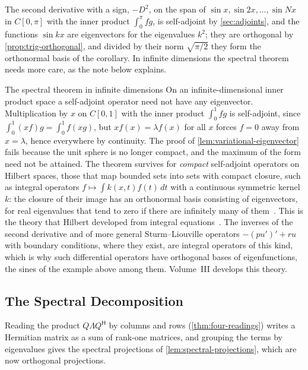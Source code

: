 The second derivative with a sign, $-D^2$, on the span of $\sin x,\sin2x,\ldots,\sin Nx$ in $C[0,\pi]$ with the inner product $\int_0^\pi fg$, is self-adjoint by \cref{sec:adjoints}, and the functions $\sin kx$ are eigenvectors for the eigenvalues $k^2$; they are orthogonal by \cref{prop:trig-orthogonal}, and divided by their norm $\sqrt{\pi/2}$ they form the orthonormal basis of the corollary. In infinite dimensions the spectral theorem needs more care, as the note below explains.

\begin{note}{The spectral theorem in infinite dimensions}
On an infinite-dimensional inner product space a self-adjoint operator need not have any eigenvector. Multiplication by $x$ on $C[0,1]$ with the inner product $\int_0^1fg$ is self-adjoint, since $\int_0^1(xf)g=\int_0^1f(xg)$, but $xf(x)=\lambda f(x)$ for all $x$ forces $f=0$ away from $x=\lambda$, hence everywhere by continuity. The proof of \cref{lem:variational-eigenvector} fails because the unit sphere is no longer compact, and the maximum of the form need not be attained. The theorem survives for \emph{compact} self-adjoint operators on Hilbert spaces, those that map bounded sets into sets with compact closure, such as integral operators $f\mapsto\int k(x,t)f(t)\,dt$ with a continuous symmetric kernel $k$: the closure of their image has an orthonormal basis consisting of eigenvectors, for real eigenvalues that tend to zero if there are infinitely many of them~\cite{kreyszig1978}. This is the theory that Hilbert developed from integral equations~\cite{hilbert1904}. The inverses of the second derivative and of more general Sturm--Liouville operators $-(pu')'+ru$ with boundary conditions, where they exist, are integral operators of this kind, which is why such differential operators have orthogonal bases of eigenfunctions, the sines of the example above among them. Volume~III develops this theory.
\end{note}

\subsection{The Spectral Decomposition}

Reading the product $Q\Lambda Q^{\mathsf H}$ by columns and rows (\cref{thm:four-readings}) writes a Hermitian matrix as a sum of rank-one matrices, and grouping the terms by eigenvalues gives the spectral projections of \cref{lem:spectral-projections}, which are now orthogonal projections.

